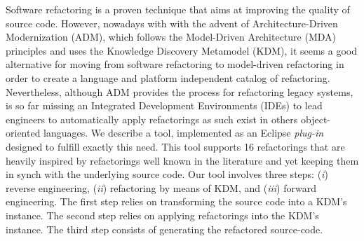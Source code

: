 

Software refactoring is a proven technique that aims at improving the quality of source code.
 However, nowadays with with the advent of Architecture-Driven Modernization (ADM), 
which follows the Model-Driven Architecture (MDA) principles and uses the Knowledge Discovery Metamodel (KDM), 
it seems a good alternative for moving from software refactoring to model-driven refactoring in order to create a language and platform independent catalog of refactoring. 
Nevertheless, although ADM provides the process for refactoring legacy systems, is so far missing an Integrated Development Environments (IDEs) 
to lead engineers to automatically apply refactorings as such exist in others object-oriented languages.
 We describe a tool, implemented as an Eclipse \textit{plug-in} designed to fulfill exactly this need. 
This tool supports 16 refactorings that are heavily inspired by refactorings well known in the literature and yet keeping them in synch with the underlying source code. 
Our tool involves three steps: (\textit{i}) reverse engineering, (\textit{ii}) refactoring by means of KDM,
 and (\textit{iii}) forward engineering. 
The first step relies on transforming the source code into a KDM's instance. 
The second step relies on applying refactorings into the KDM's instance. 
The third step consists of generating the refactored source-code.


